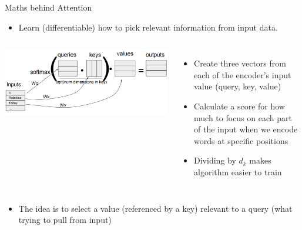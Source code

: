 \documentclass{beamer}
\begin{document}
\begin{frame}{Maths behind Attention}

\begin{itemize}
    \item Learn (differentiable) how to pick relevant information from input data.
\end{itemize}

\begin{columns}
        \includegraphics[width=1.2\linewidth]{f9.png} 

      \begin{itemize}
        \item Create three vectors from each of the encoder’s input value (query, key, value)
        \item Calculate a score for how much to focus on each part of the input when we encode words at specific positions
        \item Dividing by $d_k$ makes algorithm easier to train
      \end{itemize}
    \end{columns}

\begin{itemize}
    \item The idea is to select a value (referenced by a key) relevant to a query (what trying to pull from input)
\end{itemize}

\end{frame}
\end{document}
